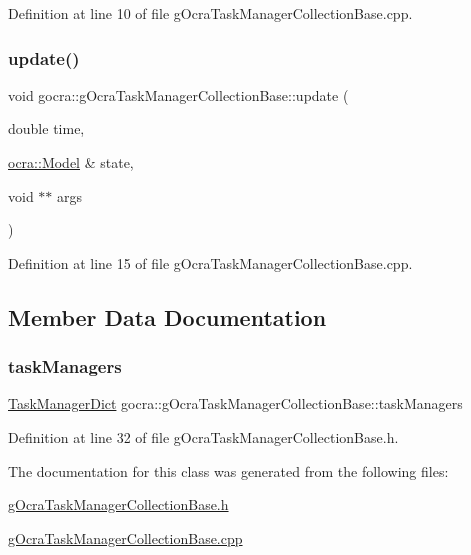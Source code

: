 Definition at line 10 of file g\+Ocra\+Task\+Manager\+Collection\+Base.\+cpp.

\hypertarget{classgocra_1_1gOcraTaskManagerCollectionBase_a08764673857307135233d7a69ad49a69}{}\label{classgocra_1_1gOcraTaskManagerCollectionBase_a08764673857307135233d7a69ad49a69} 
\subsubsection{\texorpdfstring{update()}{update()}}
{\footnotesize\ttfamily void gocra\+::g\+Ocra\+Task\+Manager\+Collection\+Base\+::update (\begin{DoxyParamCaption}\item[{double}]{time,  }\item[{\hyperlink{classocra_1_1Model}{ocra\+::\+Model} \&}]{state,  }\item[{void $\ast$$\ast$}]{args }\end{DoxyParamCaption})}



Definition at line 15 of file g\+Ocra\+Task\+Manager\+Collection\+Base.\+cpp.



\subsection{Member Data Documentation}
\hypertarget{classgocra_1_1gOcraTaskManagerCollectionBase_a247b32be87662be87239195b726fabca}{}\label{classgocra_1_1gOcraTaskManagerCollectionBase_a247b32be87662be87239195b726fabca} 
\subsubsection{\texorpdfstring{task\+Managers}{taskManagers}}
{\footnotesize\ttfamily \hyperlink{namespacegocra_ad407175473be2e361f2937acf73ca06c}{Task\+Manager\+Dict} gocra\+::g\+Ocra\+Task\+Manager\+Collection\+Base\+::task\+Managers\hspace{0.3cm}{\ttfamily [protected]}}



Definition at line 32 of file g\+Ocra\+Task\+Manager\+Collection\+Base.\+h.



The documentation for this class was generated from the following files\+:\begin{DoxyCompactItemize}
\item 
\hyperlink{gOcraTaskManagerCollectionBase_8h}{g\+Ocra\+Task\+Manager\+Collection\+Base.\+h}\item 
\hyperlink{gOcraTaskManagerCollectionBase_8cpp}{g\+Ocra\+Task\+Manager\+Collection\+Base.\+cpp}\end{DoxyCompactItemize}
